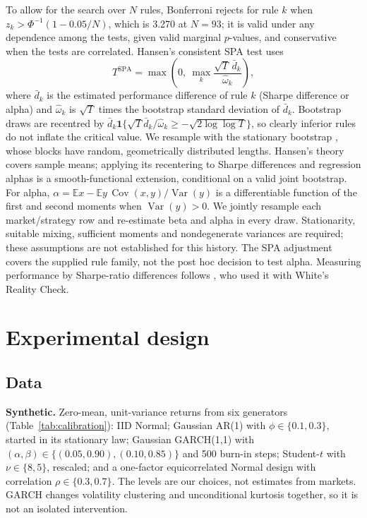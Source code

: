 \documentclass[11pt,a4paper]{article}
\newcommand{\E}{\mathbb{E}}
\newcommand{\Var}{\operatorname{Var}}
\begin{document}
To allow for the search over $N$ rules, Bonferroni rejects for rule $k$ when $z_k>\Phi^{-1}(1-0.05/N)$, which is 3.270 at $N=93$; it is valid under any dependence among the tests, given valid marginal $p$-values, and conservative when the tests are correlated. Hansen's consistent SPA test \citep{hansen2005} uses
\begin{equation}\label{eq:spa}
T^{\mathrm{SPA}}=\max\!\left(0,\ \max_{k}\frac{\sqrt T\,\bar d_k}{\hat\omega_k}\right),
\end{equation}
where $\bar d_k$ is the estimated performance difference of rule $k$ (Sharpe difference or alpha) and $\hat\omega_k$ is $\sqrt T$ times the bootstrap standard deviation of $\bar d_k$. Bootstrap draws are recentred by $\bar d_k\mathbf 1\{\sqrt T\bar d_k/\hat\omega_k\ge-\sqrt{2\log\log T}\}$, so clearly inferior rules do not inflate the critical value. We resample with the stationary bootstrap \citep{politis1994}, whose blocks have random, geometrically distributed lengths. Hansen's theory covers sample means; applying its recentering to Sharpe differences and regression alphas is a smooth-functional extension, conditional on a valid joint bootstrap. For alpha, $\alpha=\E x-\E y\,\operatorname{Cov}(x,y)/\Var(y)$ is a differentiable function of the first and second moments when $\Var(y)>0$. We jointly resample each market/strategy row and re-estimate beta and alpha in every draw. Stationarity, suitable mixing, sufficient moments and nondegenerate variances are required; these assumptions are not established for this history. The SPA adjustment covers the supplied rule family, not the post hoc decision to test alpha. Measuring performance by Sharpe-ratio differences follows \citet{sullivan1999}, who used it with White's Reality Check.

\section{Experimental design}\label{sec:design}

\subsection{Data}
\textbf{Synthetic.} Zero-mean, unit-variance returns from six generators (Table~\ref{tab:calibration}): IID Normal; Gaussian AR(1) with $\phi\in\{0.1,0.3\}$, started in its stationary law; Gaussian GARCH(1,1) with $(\alpha,\beta)\in\{(0.05,0.90),(0.10,0.85)\}$ and 500 burn-in steps; Student-$t$ with $\nu\in\{8,5\}$, rescaled; and a one-factor equicorrelated Normal design with correlation $\rho\in\{0.3,0.7\}$. The levels are our choices, not estimates from markets. GARCH changes volatility clustering and unconditional kurtosis together, so it is not an isolated intervention.
\end{document}
